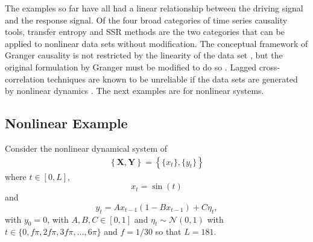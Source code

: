 \documentclass[twocolumn,aps,pre,groupedaddress]{revtex4-1}
\begin{document}
The examples so far have all had a linear relationship between the driving signal and the response signal.  Of the four broad categories of time series causality tools, transfer entropy \cite{kaiser2002} and SSR methods \cite{Sugihara2012} are the two categories that can be applied to nonlinear data sets without modification.  The conceptual framework of Granger causality is not restricted by the linearity of the data set \cite{Granger1980}, but the original formulation by Granger must be modified to do so \cite{Sun2008}.  Lagged cross-correlation techniques are known to be unreliable if the data sets are generated by nonlinear dynamics \cite{Rogosa1980}.  The next examples are for nonlinear systems.

\subsection{Nonlinear Example}
\label{sec:nonli}
Consider the nonlinear dynamical system of
\begin{eqnarray}
\label{eqn:nonlinearEX}
\left\{\mathbf{X},\mathbf{Y}\right\} = \left\{\{x_t\},\{y_t\}\right\}
\end{eqnarray}
where $t\in[0,L]$,
\begin{equation*}
x_t = \sin(t)
\end{equation*}
and
\begin{equation*}
y_t = Ax_{t-1}\left(1-Bx_{t-1}\right)+C\eta_t,
\end{equation*}
with $y_0 = 0$, with $A,B,C\in[0,1]$ and $\eta_t\sim\mathcal{N}\left(0,1\right)$ with $t\in\{0,f\pi,2f\pi,3f\pi,\ldots,6\pi\}$ and $f=1/30$ so that $L=181$.
\end{document}
